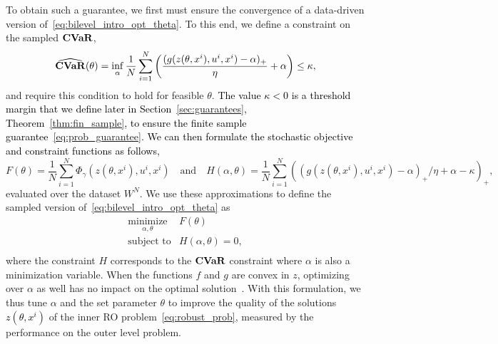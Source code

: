 \documentclass[11pt]{article}
\newcommand{\RC}[1]{\textcolor{black}{#1}}
\begin{document}
To obtain such a guarantee, we first must ensure the convergence of a data-driven version of~\eqref{eq:bilevel_intro_opt_theta}.
To this end, we define a constraint on the sampled $\mathop{\bf CVaR}$,
\begin{equation}
\label{eq:sampled_cvar}
\widehat{\mathop{\bf CVaR}}(\theta) = \inf_{\alpha} \frac{1}{N}\sum_{i=1}^N \left(\frac{(g(z(\theta,x^i),u^i,x^i)- \alpha)_+}{\eta} + \alpha \right)\leq \kappa,
\end{equation}
and require this condition to hold for feasible $\theta$.
\RC{The value $\kappa < 0$ is a threshold margin that we define later in Section~\ref{sec:guarantees}, Theorem~\ref{thm:fin_sample}, to ensure the finite sample guarantee~\eqref{eq:prob_guarantee}.}
\RC{We can then formulate the stochastic objective and constraint functions as follows,}
\begin{equation*}
F(\theta) = \frac{1}{N}\sum_{i=1}^N\Phi_{\gamma}(z(\theta,x^i),u^i, x^i) \quad \text{and}\quad H(\alpha,\theta) = \frac{1}{N}\sum_{i=1}^N ((g(z(\theta,x^i),u^i,x^i)- \alpha)_+/\eta + \alpha - \kappa)_+,
\end{equation*}
evaluated over the dataset 
$W^N$. We use these approximations to define the sampled version of~\eqref{eq:bilevel_intro_opt_theta} as
\begin{equation}
	\label{eq:bilevel_sampled}
	\begin{array}{ll}
		\underset{\alpha,\theta}{\mbox{minimize}} & F(\theta) \\
		\mbox{subject to} & H(\alpha,\theta) = 0,\\
	\end{array}
\end{equation}
where the constraint $H$ corresponds to the $\mathop{\bf CVaR}$ constraint where $\alpha$ is also a minimization variable.
When the functions $f$ and $g$ are convex in $z$, optimizing over $\alpha$ as well has no impact on the optimal solution~\citep{cvar_ref}.
With this formulation, we thus tune $\alpha$ and the set parameter $\theta$ to improve the quality of the solutions \RC{$z(\theta,x^i)$} of the inner \gls{RO} problem~\eqref{eq:robust_prob}, measured by the performance on the outer level problem.
\end{document}

